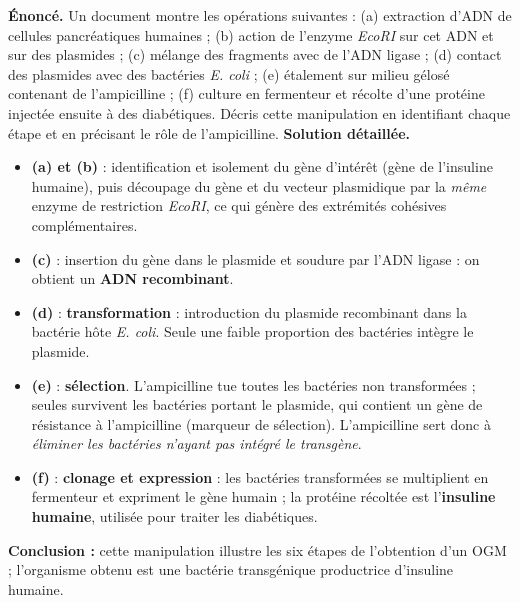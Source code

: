 \documentclass[11pt]{article}
\begin{document}
\begin{exoresolu}
\textbf{Énoncé.} Un document montre les opérations suivantes : (a) extraction d'ADN de cellules pancréatiques humaines ; (b) action de l'enzyme \emph{EcoRI} sur cet ADN et sur des plasmides ; (c) mélange des fragments avec de l'ADN ligase ; (d) contact des plasmides avec des bactéries \emph{E. coli} ; (e) étalement sur milieu gélosé contenant de l'ampicilline ; (f) culture en fermenteur et récolte d'une protéine injectée ensuite à des diabétiques. Décris cette manipulation en identifiant chaque étape et en précisant le rôle de l'ampicilline.
\tcblower
\textbf{Solution détaillée.}
\begin{itemize}
\item \textbf{(a) et (b)} : identification et isolement du gène d'intérêt (gène de l'insuline humaine), puis découpage du gène et du vecteur plasmidique par la \emph{même} enzyme de restriction \emph{EcoRI}, ce qui génère des extrémités cohésives complémentaires.
\item \textbf{(c)} : insertion du gène dans le plasmide et soudure par l'ADN ligase : on obtient un \textbf{ADN recombinant}.
\item \textbf{(d)} : \textbf{transformation} : introduction du plasmide recombinant dans la bactérie hôte \emph{E. coli}. Seule une faible proportion des bactéries intègre le plasmide.
\item \textbf{(e)} : \textbf{sélection}. L'ampicilline tue toutes les bactéries non transformées ; seules survivent les bactéries portant le plasmide, qui contient un gène de résistance à l'ampicilline (marqueur de sélection). L'ampicilline sert donc à \emph{éliminer les bactéries n'ayant pas intégré le transgène}.
\item \textbf{(f)} : \textbf{clonage et expression} : les bactéries transformées se multiplient en fermenteur et expriment le gène humain ; la protéine récoltée est l'\textbf{insuline humaine}, utilisée pour traiter les diabétiques.
\end{itemize}
\textbf{Conclusion :} cette manipulation illustre les six étapes de l'obtention d'un OGM ; l'organisme obtenu est une bactérie transgénique productrice d'insuline humaine.
\end{exoresolu}
\end{document}
